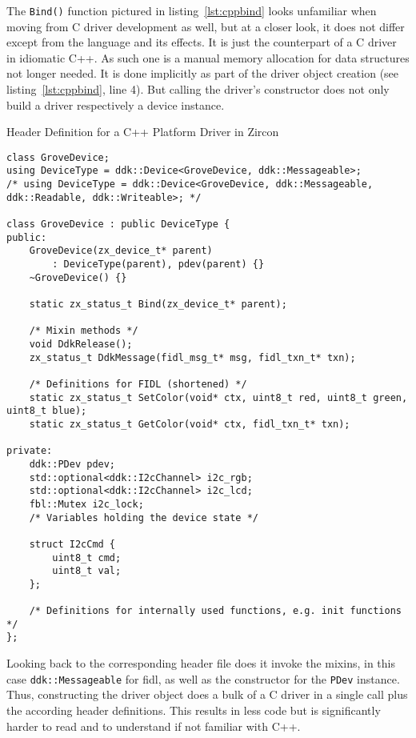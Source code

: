 The \texttt{Bind()} function pictured in listing~\ref{lst:cppbind} looks unfamiliar when moving from C driver development as well, but at a closer look, it does not differ except from the language and its effects.
It is just the counterpart of a C driver in idiomatic C++.
As such one is a manual memory allocation for data structures not longer needed.
It is done implicitly as part of the driver object creation (see listing~\ref{lst:cppbind}, line 4).
But calling the driver's constructor does not only build a driver respectively a device instance.
%
\begin{listing} [H]
    \caption{Header Definition for a C++ Platform Driver in Zircon}
\label{lst:cppheader}
\begin{verbatim}
class GroveDevice;
using DeviceType = ddk::Device<GroveDevice, ddk::Messageable>;
/* using DeviceType = ddk::Device<GroveDevice, ddk::Messageable, ddk::Readable, ddk::Writeable>; */

class GroveDevice : public DeviceType {
public:
    GroveDevice(zx_device_t* parent)
        : DeviceType(parent), pdev(parent) {}
    ~GroveDevice() {}

    static zx_status_t Bind(zx_device_t* parent);

    /* Mixin methods */
    void DdkRelease();
    zx_status_t DdkMessage(fidl_msg_t* msg, fidl_txn_t* txn);

    /* Definitions for FIDL (shortened) */
    static zx_status_t SetColor(void* ctx, uint8_t red, uint8_t green, uint8_t blue);
    static zx_status_t GetColor(void* ctx, fidl_txn_t* txn);

private:
    ddk::PDev pdev;
    std::optional<ddk::I2cChannel> i2c_rgb;
    std::optional<ddk::I2cChannel> i2c_lcd;
    fbl::Mutex i2c_lock;
    /* Variables holding the device state */

    struct I2cCmd {
        uint8_t cmd;
        uint8_t val;
    };

    /* Definitions for internally used functions, e.g. init functions */
};
\end{verbatim}
\end{listing}
%
Looking back to the corresponding header file does it invoke the mixins, in this case \texttt{ddk::Messageable} for \ac{fidl}, as well as the constructor for the \texttt{PDev} instance.
Thus, constructing the driver object does a bulk of a C driver in a single call plus the according header definitions.
This results in less code but is significantly harder to read and to understand if not familiar with C++.
